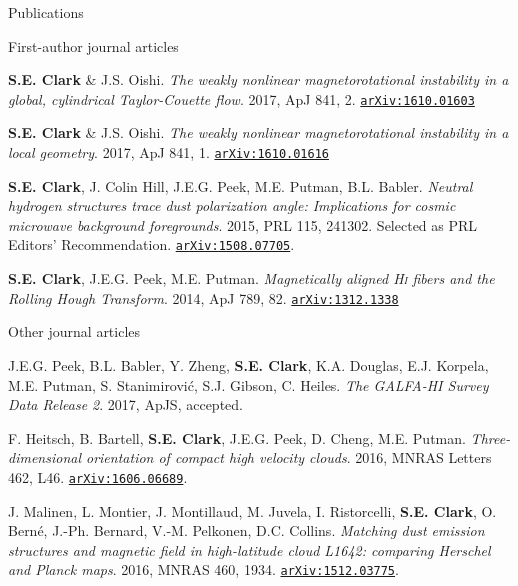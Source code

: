 \documentclass{resume_clark} %
\begin{document}
\begin{rSection}{Publications}

First-author journal articles

\begin{etaremune}

\item {\bf S.E. Clark} \& J.S. Oishi. \textit{The weakly nonlinear magnetorotational instability in a global, cylindrical Taylor-Couette flow}. 2017, {ApJ 841, 2}. \href{https://arxiv.org/abs/1610.01603}{\tt arXiv:1610.01603}

\item {\bf S.E. Clark} \& J.S. Oishi. \textit{The weakly nonlinear magnetorotational instability in a local geometry}. 2017, {ApJ 841, 1}. \href{http://arxiv.org/abs/1610.01616}{\tt arXiv:1610.01616}

\item {\bf S.E. Clark}, J. Colin Hill, J.E.G. Peek, M.E. Putman, B.L. Babler. \textit{Neutral hydrogen structures trace dust polarization angle: Implications for cosmic microwave background foregrounds}. 2015, PRL 115, 241302. Selected as PRL Editors' Recommendation. \href{http://arxiv.org/abs/1508.07005}{\tt arXiv:1508.07705}. 

\item {\bf S.E. Clark}, J.E.G. Peek, M.E. Putman. {\em Magnetically aligned {\textit{\textsc{Hi}}} fibers and the Rolling Hough Transform}. 2014, {ApJ 789, 82}. \href{http://arxiv.org/abs/1312.1338}{\tt arXiv:1312.1338}
\end{etaremune}

Other journal articles

\begin{etaremune}
\item J.E.G. Peek, B.L. Babler, Y. Zheng, {\bf S.E. Clark}, K.A. Douglas, E.J. Korpela, M.E. Putman, S. Stanimirovi\'c, S.J. Gibson, C. Heiles. \textit{The GALFA-HI Survey Data Release 2}. 2017, ApJS, accepted.

\item F. Heitsch, B. Bartell, {\bf S.E. Clark}, J.E.G. Peek, D. Cheng, M.E. Putman. \textit{Three-dimensional orientation of compact high velocity clouds}. 2016, MNRAS Letters 462, L46. \href{http://arxiv.org/abs/1606.06689}{\tt arXiv:1606.06689}.

\item J. Malinen, L. Montier, J. Montillaud, M. Juvela, I. Ristorcelli, {\bf S.E. Clark}, O. Bern\'e, J.-Ph. Bernard, V.-M. Pelkonen, D.C. Collins. \textit{Matching dust emission structures and magnetic field in high-latitude cloud L1642: comparing Herschel and Planck maps}. 2016, MNRAS 460, 1934. \href{http://arxiv.org/abs/1512.03775}{\tt arXiv:1512.03775}. 


\end{etaremune}
\end{rSection}
\end{document}
